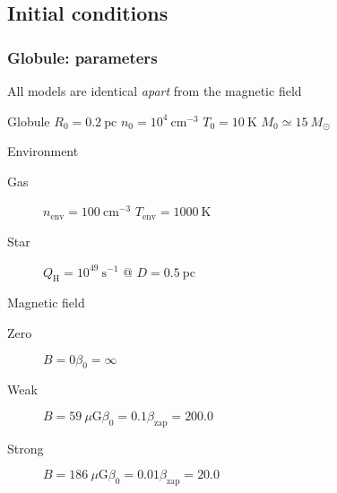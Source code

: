 \documentclass[presentation]{beamer}
\begin{document}
\subsection{Initial conditions}

\begin{frame}
  \frametitle{Globule: parameters}
  All models are identical \emph{apart} from the magnetic field
  \begin{block}{Globule}
    \smallskip
    $R_0 = 0.2~\mathrm{pc}$ \quad $n_0 = 10^4~\mathrm{cm}^{-3}$ \quad
    $T_0 = 10~\mathrm{K}$ \quad $M_0 \simeq 15~M_\odot$
  \end{block}
  \begin{block}{Environment}
    \begin{description}
      \item[Gas]\quad $n_\mathrm{env} = 100~\mathrm{cm}^{-3}$ \quad $T_\mathrm{env} = 1000~\mathrm{K}$\\
      \item[Star]\quad $Q_\mathrm{H} = 10^{49}~\mathrm{s}^{-1}$ @ $D = 0.5~\mathrm{pc}$
    \end{description}
  \end{block}
  \begin{block}{Magnetic field}
    \begin{description}
    \item[Zero]\quad $B = 0$\quad $\beta_0 = \infty$ 
    \item[Weak]\quad $B = 59~\mu\mathrm{G}$\quad $\beta_0 = 0.1$\quad $\beta_\mathrm{zap} = 200.0$ 
    \item[Strong]\quad $B = 186~\mu\mathrm{G}$\quad $\beta_0 = 0.01$\quad $\beta_\mathrm{zap} = 20.0$ 
    \end{description}
  \end{block}
\end{frame}
\end{document}
